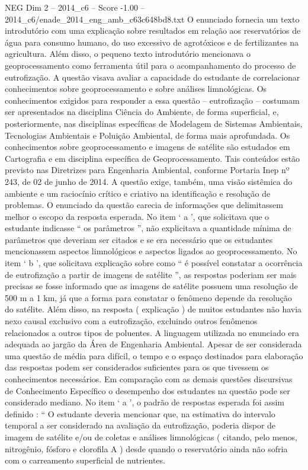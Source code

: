 \begin{textsample}{NEG Dim 2 – 2014\_c6 – Score -1.00 – 2014\_c6/enade\_2014\_eng\_amb\_c63c648bd8.txt}
O enunciado fornecia um texto introdutório com uma explicação sobre resultados em relação aos reservatórios de água para consumo humano, do uso excessivo de agrotóxicos e de fertilizantes na agricultura.
Além disso, o pequeno texto introdutório mencionava o geoprocessamento como ferramenta útil para o acompanhamento do processo de eutrofização.
A questão visava avaliar a capacidade do estudante de correlacionar conhecimentos sobre geoprocessamento e sobre análises limnológicas.
Os conhecimentos exigidos para responder a essa questão – eutrofização – costumam ser apresentados na disciplina Ciência do Ambiente, de forma superficial, e, posteriormente, nas disciplinas específicas de Modelagem de Sistemas Ambientais, Tecnologias Ambientais e Poluição Ambiental, de forma mais aprofundada.
Os conhecimentos sobre geoprocessamento e imagens de satélite são estudados em Cartografia e em disciplina específica de Geoprocessamento.
Tais conteúdos estão previsto nas Diretrizes para Engenharia Ambiental, conforme Portaria Inep nº 243, de 02 de junho de 2014.
A questão exige, também, uma visão sistêmica do ambiente e um raciocínio crítico e criativo na identificação e resolução de problemas.
O enunciado da questão carecia de informações que delimitassem melhor o escopo da resposta esperada.
No item ‘ a ’, que solicitava que o estudante indicasse “ os parâmetros ”, não explicitava a quantidade mínima de parâmetros que deveriam ser citados e se era necessário que os estudantes mencionassem aspectos limnológicos e aspectos ligados ao geoprocessamento.
No item ‘ b ’, que solicitava explicação sobre como “ é possível constatar a ocorrência de eutrofização a partir de imagens de satélite ”, as respostas poderiam ser mais precisas se fosse informado que as imagens de satélite possuem uma resolução de 500 m a 1 km, já que a forma para constatar o fenômeno depende da resolução do satélite.
Além disso, na resposta ( explicação ) de muitos estudantes não havia nexo causal exclusivo com a eutrofização, excluindo outros fenômenos relacionados a outros tipos de poluentes.
A linguagem utilizada no enunciado era adequada ao jargão da Área de Engenharia Ambiental.
Apesar de ser considerada uma questão de média para difícil, o tempo e o espaço destinados para elaboração das respostas podem ser considerados suficientes para os que tivessem os conhecimentos necessários.
Em comparação com as demais questões discursivas de Conhecimento Específico o desempenho dos estudantes na questão pode ser considerado mediano.
No item ‘ a ’, o padrão de respostas esperada foi assim definido : “ O estudante deveria mencionar que, na estimativa do intervalo temporal a ser considerado na avaliação da eutrofização, poderia dispor de imagem de satélite e/ou de coletas e análises limnológicas ( citando, pelo menos, nitrogênio, fósforo e clorofila A ) desde quando o reservatório ainda não sofria com o carreamento superficial de nutrientes.

\end{textsample}
